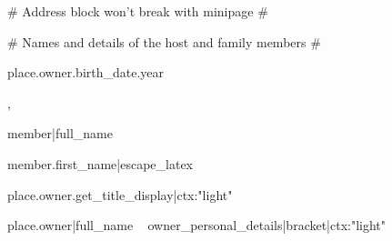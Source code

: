 {{{{{{{{{{{{{{{{{{\begin{minipage}{\textwidth} {# Address block won't break with minipage #}
{{                  {# Names and details of the host and family members #}
                  {%
                    {{ place.owner.birth_date.year }}
                    {%
                  {%
                  {%
                    {%
                      {%
                        {%
                          ,{ }
                          {%
                            {{ member|full_name }}
                          {%
                            {{ member.first_name|escape_latex }}
                          {%
                          {%
                        {%
                      {%
                    {%
                  {%
                  {{ place.owner.get_title_display|ctx:"light" }}
                  {%
                    {{ place.owner|full_name }}~{{ owner_personal_details|bracket|ctx:"light" }}
                    {%
                  {%

}}}}}}}}}}}}}}}}}}}}
\end{minipage}}}}}}}}}}}}}}}}}}}
